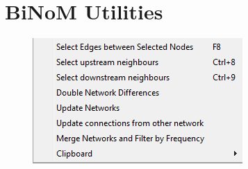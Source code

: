 \documentclass[11pt]{article}
\begin{document}
\section{BiNoM Utilities}
\begin{figure}[h]
\includegraphics{graphics/BiNoM_Utilities}
\end{figure}
\newpage
 
 
\end{document}
